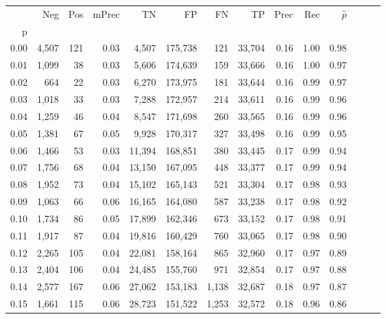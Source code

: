 \begin{tabular}{rrrrrrrrrrrrrr}
\toprule
{} &    Neg &  Pos & mPrec &       TN &       FP &      FN &      TP &  Prec &   Rec & $\hat{p}$ \\
p    &        &      &       &          &          &         &         &       &       &           \\
\midrule
0.00 &  4,507 &  121 &  0.03 &    4,507 &  175,738 &     121 &  33,704 &  0.16 &  1.00 &      0.98 \\
0.01 &  1,099 &   38 &  0.03 &    5,606 &  174,639 &     159 &  33,666 &  0.16 &  1.00 &      0.97 \\
0.02 &    664 &   22 &  0.03 &    6,270 &  173,975 &     181 &  33,644 &  0.16 &  0.99 &      0.97 \\
0.03 &  1,018 &   33 &  0.03 &    7,288 &  172,957 &     214 &  33,611 &  0.16 &  0.99 &      0.96 \\
0.04 &  1,259 &   46 &  0.04 &    8,547 &  171,698 &     260 &  33,565 &  0.16 &  0.99 &      0.96 \\
0.05 &  1,381 &   67 &  0.05 &    9,928 &  170,317 &     327 &  33,498 &  0.16 &  0.99 &      0.95 \\
0.06 &  1,466 &   53 &  0.03 &   11,394 &  168,851 &     380 &  33,445 &  0.17 &  0.99 &      0.94 \\
0.07 &  1,756 &   68 &  0.04 &   13,150 &  167,095 &     448 &  33,377 &  0.17 &  0.99 &      0.94 \\
0.08 &  1,952 &   73 &  0.04 &   15,102 &  165,143 &     521 &  33,304 &  0.17 &  0.98 &      0.93 \\
0.09 &  1,063 &   66 &  0.06 &   16,165 &  164,080 &     587 &  33,238 &  0.17 &  0.98 &      0.92 \\
0.10 &  1,734 &   86 &  0.05 &   17,899 &  162,346 &     673 &  33,152 &  0.17 &  0.98 &      0.91 \\
0.11 &  1,917 &   87 &  0.04 &   19,816 &  160,429 &     760 &  33,065 &  0.17 &  0.98 &      0.90 \\
0.12 &  2,265 &  105 &  0.04 &   22,081 &  158,164 &     865 &  32,960 &  0.17 &  0.97 &      0.89 \\
0.13 &  2,404 &  106 &  0.04 &   24,485 &  155,760 &     971 &  32,854 &  0.17 &  0.97 &      0.88 \\
0.14 &  2,577 &  167 &  0.06 &   27,062 &  153,183 &   1,138 &  32,687 &  0.18 &  0.97 &      0.87 \\
0.15 &  1,661 &  115 &  0.06 &   28,723 &  151,522 &   1,253 &  32,572 &  0.18 &  0.96 &      0.86 \\

\end{tabular}

